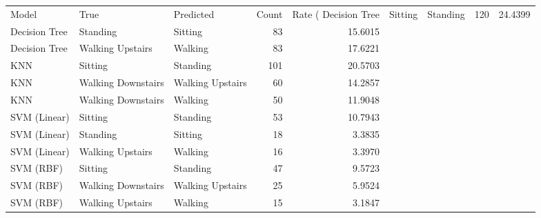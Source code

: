 \begin{tabular}{lllrr}
\toprule
Model & True & Predicted & Count & Rate (%
\midrule
Decision Tree & Sitting & Standing & 120 & 24.4399 \\
Decision Tree & Standing & Sitting & 83 & 15.6015 \\
Decision Tree & Walking Upstairs & Walking & 83 & 17.6221 \\
KNN & Sitting & Standing & 101 & 20.5703 \\
KNN & Walking Downstairs & Walking Upstairs & 60 & 14.2857 \\
KNN & Walking Downstairs & Walking & 50 & 11.9048 \\
SVM (Linear) & Sitting & Standing & 53 & 10.7943 \\
SVM (Linear) & Standing & Sitting & 18 & 3.3835 \\
SVM (Linear) & Walking Upstairs & Walking & 16 & 3.3970 \\
SVM (RBF) & Sitting & Standing & 47 & 9.5723 \\
SVM (RBF) & Walking Downstairs & Walking Upstairs & 25 & 5.9524 \\
SVM (RBF) & Walking Upstairs & Walking & 15 & 3.1847 \\
\bottomrule
\end{tabular}
